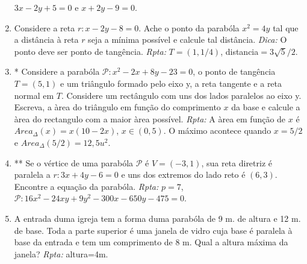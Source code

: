 \documentclass{article}
\begin{document}
\begin{enumerate}
     $3x-2y+5=0$ e $x+2y-9=0$.
     \item Considere a reta $r: x-2y-8=0$. 
     Ache o ponto da parabóla $x^2=4y$ tal que a 
     distância à reta $r$ seja a mínima possível e calcule 
     tal distância.
     {\it Dica: } O ponto deve ser ponto de tangência. 
     {\it Rpta: } $T=(1,1/4)$, distancia$=3\sqrt{5}/2$.
     \item * Considere a parabóla 
     $\mathcal{P}: x^2-2x+8y-23=0$, o ponto de tangência 
     $T=(5,1)$ e um triângulo formado 
     pelo eixo y, a reta tangente e a reta normal em $T$.
     Considere um rectângulo com uns dos lados paralelos
     ao eixo y. Escreva, a àrea do triângulo em função 
     do comprimento $x$ da base e calcule a àrea do rectangulo 
     com a maior àrea possível. 
     {\it Rpta: } A àrea em função de $x$ é $Area_{\Delta}(x)=x(10-2x)$, 
     $x \in (0,5)$.
     O máximo acontece quando $x=5/2$ e $Area_{\Delta}(5/2)=12,5 u^2$.
     \item ** Se o vértice de uma parabóla $\mathcal{P}$ 
     é $V=(-3,1)$, sua reta diretriz é paralela a 
     $r: 3x+4y-6=0$ e uns dos extremos do lado reto é $(6,3)$. 
     Encontre a equação da parabóla. 
     {\it Rpta: } $p=7$, $\mathcal{P}: 16x^2-24xy+9y^2-300x-650y-475=0$.
     \item A entrada duma igreja tem a forma 
     duma parabóla de 9 m. de altura e 12 m. de base. 
     Toda a parte superior é uma janela de vidro cuja 
     base é paralela à base da entrada
     e tem um comprimento de 8 m. 
     Qual a altura máxima da janela?
     {\it Rpta: } altura=4m.
   \end{enumerate}
\end{document}
